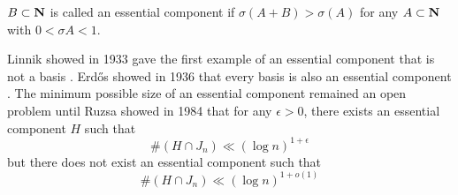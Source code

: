 \begin{definition}
    $B\subset \mathbf{N}$ is called an essential component if $\sigma(A+B)>\sigma(A)$ for any $A\subset\mathbf{N}$ with $0<\sigma A<1$.
\end{definition}

Linnik showed in 1933 gave the first example of an essential component that is not a basis \cite{zbMATH03105552}.
Erd\H{o}s showed in 1936 that every basis is also an essential component \cite{Erdos1935}.
The minimum possible size of an essential component remained an open problem until Ruzsa showed in 1984\cite{Ruzsa_1987} that for any $\epsilon>0$, there exists an essential component $H$ such that
$$\#(H\cap J_n)\ll (\log n)^{1+\epsilon}$$ but there does not exist an essential component such that
$$\#(H\cap J_n)\ll(\log  n)^{1+o(1)}$$
